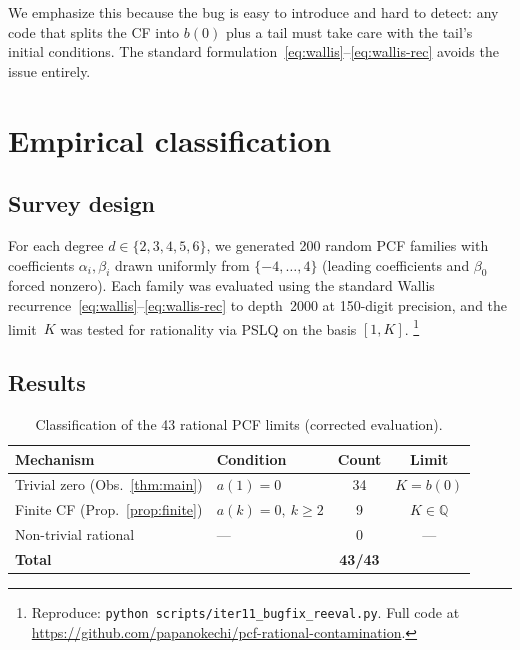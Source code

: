 \documentclass[11pt]{amsart}
\theoremstyle{definition}
\theoremstyle{remark}
\begin{document}
We emphasize this because the bug is easy to introduce and hard
to detect: any code that splits the CF into $b(0)$ plus a tail
must take care with the tail's initial conditions.
The standard formulation~\eqref{eq:wallis}--\eqref{eq:wallis-rec}
avoids the issue entirely.

\section{Empirical classification}\label{sec:empirical}

\subsection{Survey design}
For each degree $d\in\{2,3,4,5,6\}$, we generated 200 random PCF families
with coefficients $\alpha_i,\beta_i$ drawn uniformly from $\{-4,\ldots,4\}$
(leading coefficients and $\beta_0$ forced nonzero).
Each family was evaluated using the standard Wallis
recurrence~\eqref{eq:wallis}--\eqref{eq:wallis-rec} to depth~2000
at 150-digit precision, and the limit~$K$ was tested for rationality
via PSLQ on the basis $[1,K]$.%
\footnote{Reproduce:
  \texttt{python scripts/iter11\_bugfix\_reeval.py}.
  Full code at \url{https://github.com/papanokechi/pcf-rational-contamination}.}

\subsection{Results}

\begin{table}[ht]
\centering
\caption{Classification of the 43 rational PCF limits (corrected evaluation).}
\label{tab:classification}
\small
\begin{tabular}{@{}llcc@{}}
\toprule
\textbf{Mechanism} & \textbf{Condition} & \textbf{Count} & \textbf{Limit} \\
\midrule
Trivial zero (Obs.~\ref{thm:main}) & $a(1)=0$ & 34 & $K=b(0)$ \\
Finite CF (Prop.~\ref{prop:finite}) & $a(k)=0,\ k\ge 2$ & 9 & $K\in\mathbb{Q}$ \\
Non-trivial rational & --- & 0 & --- \\
\midrule
\textbf{Total} & & \textbf{43/43} & \\
\bottomrule
\end{tabular}
\end{table}
\end{document}
